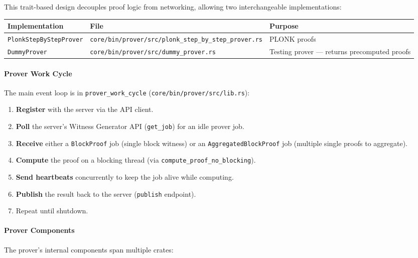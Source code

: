 This trait-based design decouples proof logic from networking, allowing two interchangeable implementations:

\begin{table}[h]
\centering
\begin{tabular}{lll}
\toprule
\textbf{Implementation} & \textbf{File} & \textbf{Purpose} \\
\midrule
\texttt{PlonkStepByStepProver} & \texttt{core/bin/prover/src/plonk\_step\_by\_step\_prover.rs} & PLONK proofs \\
\texttt{DummyProver} & \texttt{core/bin/prover/src/dummy\_prover.rs} & Testing prover --- returns precomputed proofs \\
\bottomrule
\end{tabular}
\end{table}

\paragraph{Prover Work Cycle}

The main event loop is in \texttt{prover\_work\_cycle} (\texttt{core/bin/prover/src/lib.rs}):

\begin{enumerate}
    \item \textbf{Register} with the server via the API client.
    \item \textbf{Poll} the server's Witness Generator API (\texttt{get\_job}) for an idle prover job.
    \item \textbf{Receive} either a \texttt{BlockProof} job (single block witness) or an \texttt{AggregatedBlockProof} job (multiple single proofs to aggregate).
    \item \textbf{Compute} the proof on a blocking thread (via \texttt{compute\_proof\_no\_blocking}).
    \item \textbf{Send heartbeats} concurrently to keep the job alive while computing.
    \item \textbf{Publish} the result back to the server (\texttt{publish} endpoint).
    \item Repeat until shutdown.
\end{enumerate}

\vspace{5mm}
\paragraph{Prover Components}

The prover's internal components span multiple crates:

